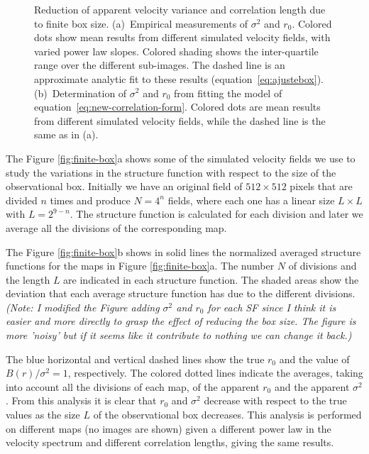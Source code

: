 \documentclass[fleqn,usenatbib, useAMS, a4paper]{mnras}
\begin{document}
\begin{figure}
\begin{tabular}{@{} l @{}}
  \end{tabular}
  \caption{
    Reduction of apparent velocity variance and correlation length
    due to finite box size.
    (a)~Empirical measurements of \(\sigma^2\) and \(r_0\).
    Colored dots show mean results from different simulated velocity fields,
    with varied power law slopes.
    Colored shading shows the inter-quartile range over the different sub-images.
    The dashed line is an approximate analytic fit to these results
    (equation~\eqref{eq:ajustebox}).
    (b)~Determination of \(\sigma^2\) and \(r_0\) from fitting the model
    of equation~\eqref{eq:new-correlation-form}.
    Colored dots are mean results from different simulated velocity fields,
    while the dashed line is the same as in (a).
  }
  \label{fig:finite-box-effect}
\end{figure}

The Figure \ref{fig:finite-box}a shows some of the simulated velocity fields we use to study the variations in the structure function with respect to the size of the observational box.
Initially we have an original field of \(512 \times 512 \) pixels that are divided \(n\) times and produce \(N = 4^n\) fields, where each one has a linear size \(L \times L \) with \(L = 2^{9 -n}\).
The structure function is calculated for each division and later we average all the divisions of the corresponding map. 

The Figure \ref{fig:finite-box}b shows in solid lines the normalized averaged structure functions for the maps in Figure \ref{fig:finite-box}a.
The number \(N\) of divisions and the length \(L\) are indicated in each structure function.
The shaded areas show the deviation that each average structure function has due to the different divisions. 
\textit{(Note: I modified the Figure adding \(\sigma^2\) and \(r_0\) for each SF since I think it is easier and more directly to grasp the effect of reducing the box size. The figure is more 'noisy' but if it seems like it contribute to nothing we can change it back.)}

The blue horizontal and vertical dashed lines show the true \(r_{0}\) and the value of \(B(r) / \sigma^2 = 1 \), respectively.
The colored dotted lines indicate the averages, taking into account all the divisions of each map, of the apparent \(r_ {0}\) and the apparent \(\sigma^2 \).
From this analysis it is clear that \(r_0\) and \(\sigma^ 2 \) decrease with respect to the true values as the size \(L\) of the observational box decreases. 
This analysis is performed on different maps (no images are shown) given a different power law in the velocity spectrum and different correlation lengths, giving the same results. 
\end{document}

